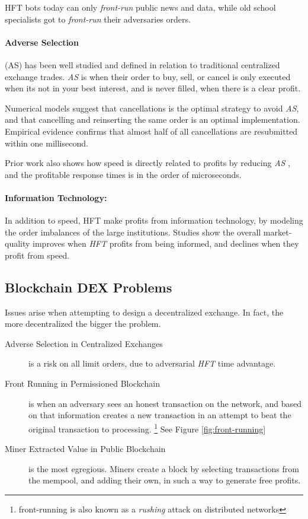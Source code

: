 \documentclass[12pt]{article}
\begin{document}
HFT bots today can only \emph{front-run} public news and data, while old school specialists got to \emph{front-run} their adversaries orders. 

\paragraph{Adverse Selection} (AS) has been well studied and defined in relation to traditional centralized exchange trades. \emph{AS} is when their order to buy, sell, or cancel is only executed when its not in your best interest, and is never filled, when there is a clear profit. 

Numerical models suggest that cancellations is the optimal strategy to avoid \emph{AS}, and that cancelling and reinserting the same order is an optimal implementation. \cite{Lehalle}  Empirical evidence confirms that almost half of all cancellations are resubmitted within one millisecond. \cite{Menkveld2} 

Prior work also shows how speed is directly related to profits by reducing \emph{AS} \cite{Lehalle},  and the profitable response times is in the order of microseconds. \cite{Menkveld2} 

\paragraph{Information Technology:} In addition to speed, HFT make profits from information technology, by modeling the order imbalances of the large institutions. Studies show the overall market-quality improves when \emph{HFT} profits from being informed, and declines when they profit from speed. \cite{Menkveld2}


 
\subsection*{Blockchain DEX Problems}

Issues arise when attempting to design a decentralized exchange. In fact, the more decentralized the bigger the problem. 

\begin{description}
\item[Adverse Selection in Centralized Exchanges] is a risk on all limit orders, due to adversarial \emph{HFT} time advantage. 
\item[Front Running in Permissioned Blockchain] is when an adversary sees an honest transaction on the network, and based on that information creates a new transaction in an attempt to beat the original transaction to processing. \footnote{front-running is also known as a \emph{rushing} attack on distributed networks} See Figure \ref{fig:front-running} \cite{Eskandari} 
\item[Miner Extracted Value in Public Blockchain] is the most egregious. Miners create a block by selecting transactions from the mempool, and adding their own, in such a way to generate free profits. 
\end{description}
\end{document}
